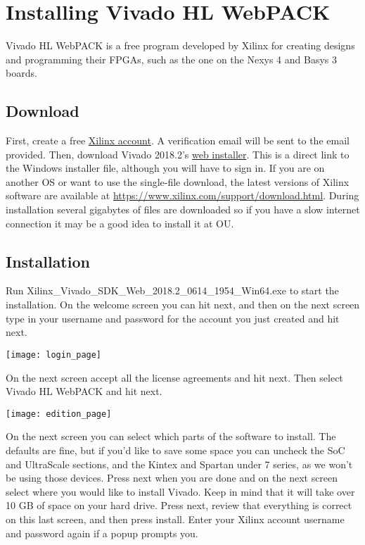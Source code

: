 \section{Installing Vivado HL WebPACK}
Vivado HL WebPACK is a free program developed by Xilinx for creating designs and programming their
FPGAs, such as the one on the Nexys 4 and Basys 3 boards.

\subsection{Download}
First, create a free \href{https://www.xilinx.com/registration/create-account.html}
{Xilinx account}.
A verification email will be sent to the email provided.
Then, download Vivado 2018.2's
\href{https://www.xilinx.com/member/forms/download/xef.html?filename=Xilinx_Vivado_SDK_Web_2018.2_0614_1954_Win64.exe}
{web installer}.
This is a direct link to the Windows installer file, although you will have to sign in.
If you are on another OS or want to use the single-file download, the latest versions of Xilinx
software are available at \url{https://www.xilinx.com/support/download.html}.
During installation several gigabytes of files are downloaded so if you have a slow internet
connection it may be a good idea to install it at OU.

\subsection{Installation}
Run Xilinx\_Vivado\_SDK\_Web\_2018.2\_0614\_1954\_Win64.exe to start the installation.
On the welcome screen you can hit next, and then on the next screen type in your username and
password for the account you just created and hit next.

\begin{center}
    \texttt{[image: login\_page]}
\end{center}

On the next screen accept all the license agreements and hit next.
Then select Vivado HL WebPACK and hit next.

\begin{center}
    \texttt{[image: edition\_page]}
\end{center}

On the next screen you can select which parts of the software to install.
The defaults are fine, but if you'd like to save some space you can uncheck the SoC and UltraScale
sections, and the Kintex and Spartan under 7 series, as we won't be using those devices.
Press next when you are done and on the next screen select where you would like to install Vivado.
Keep in mind that it will take over 10 GB of space on your hard drive.
Press next, review that everything is correct on this last screen, and then press install.
Enter your Xilinx account username and password again if a popup prompts you.

